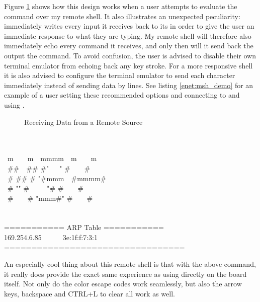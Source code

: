Figure \ref{fig:msh_design} shows how this design works when a user attempts to evaluate the command  over my remote shell. It also illustrates an unexpected peculiarity:  immediately writes every input it receives back to its  in order to give the user an immediate response to what they are typing. My remote shell will therefore also immediately echo every command it receives, and only then will it send back the output the command. To avoid confusion, the user is advised to disable their own terminal emulator from echoing back any key stroke. For a more responsive shell it is also advised to configure the terminal emulator to send each character immediately instead of sending data by lines. See listing \ref{enet:msh_demo} for an example of a user setting these recommended options and connecting to and using .

\begin{figure}[H]
\centering
    \resizebox{\textwidth}{!} {
        
    }
    \caption{Receiving Data from a Remote Source}
    \label{fig:msh_design}
    
\end{figure}

\begin{code}
\begin{mdframed}[style=shell]
\\
\\
\ m\ \ \ \ m\ \ mmmm\ \ m\ \ \ \ m\\
\ \#\#\ \ \#\# \#"\ \ \ " \#\ \ \ \ \#\\
\ \# \#\# \# "\#mmm\ \ \#mmmm\#\\
\ \# "" \#\ \ \ \ \ "\# \#\ \ \ \ \#\\
\ \#\ \ \ \ \# "mmm\#" \#\ \ \ \ \#\\
\\
\\
=========== ARP Table ===========\\
169.254.6.85\ \ \ \ \ \ 3e:1f:f:7:3:1\\
=================================\\
\end{mdframed}
\caption{Setting Recommended Settings and Using netcat to Connect to }
\end{code}
\label{enet:msh_demo}

An especially cool thing about this remote shell is that with the above command, it really does provide the exact same experience as using  directly on the board itself. Not only do the color escape codes work seamlessly, but also the arrow keys, backspace and CTRL+L to clear all work as well.

